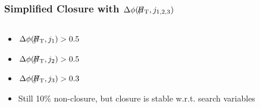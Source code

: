 \documentclass{beamer}
\begin{document}
\begin{frame}
 \frametitle{Simplified Closure with $\Delta\phi(\MHT,j_{1,2,3})$}
 \begin{columns}
  \begin{column}{0.33\textwidth}
  \begin{itemize}
   \item $\Delta\phi(\MHT,j_{1})>0.5$
   \item $\Delta\phi(\MHT,j_{2})>0.5$
   \item $\Delta\phi(\MHT,j_{3})>0.3$ 
   \item Still 10\% non-closure, but closure is stable w.r.t. search variables
  \end{itemize}
  \end{column}
  \begin{column}{0.33\textwidth}
   \begin{tikzpicture}

\end{tikzpicture}
\end{column}
\end{columns}
\end{frame}
\end{document}

